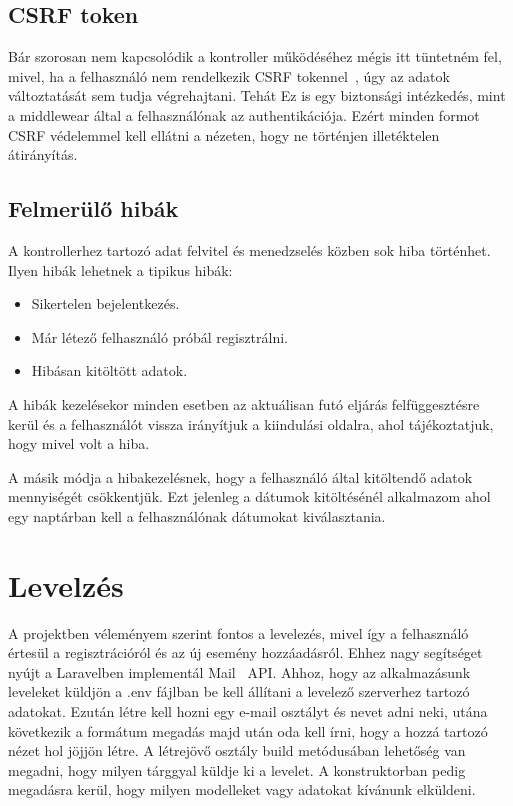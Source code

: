 \documentclass[
]{thesis-ekf}
\theoremstyle{definition}
\theoremstyle{remark}
\begin{document}
\subsection{CSRF token}

Bár szorosan nem kapcsolódik a kontroller működéséhez mégis itt tüntetném fel, mivel, ha a felhasználó nem rendelkezik CSRF tokennel~\cite{laravel_csrf}, úgy az adatok változtatását sem tudja végrehajtani. Tehát Ez is egy biztonsági intézkedés, mint a middlewear által a felhasználónak az authentikációja. Ezért minden formot CSRF védelemmel kell ellátni a nézeten, hogy ne történjen illetéktelen átirányítás.

\subsection{Felmerülő hibák}

A kontrollerhez tartozó adat felvitel és menedzselés közben sok hiba történhet. Ilyen hibák lehetnek a tipikus hibák:
\begin{itemize}
\item Sikertelen bejelentkezés. 
\item Már létező felhasználó próbál regisztrálni.
\item Hibásan kitöltött adatok.
\end{itemize}
A hibák kezelésekor minden esetben az aktuálisan futó eljárás felfüggesztésre kerül és a felhasználót vissza irányítjuk a kiindulási oldalra, ahol tájékoztatjuk, hogy mivel volt a hiba. 

A másik módja a hibakezelésnek, hogy a felhasználó által kitöltendő adatok mennyiségét csökkentjük. Ezt jelenleg a dátumok kitöltésénél alkalmazom ahol egy naptárban kell a felhasználónak dátumokat kiválasztania. 


\section{Levelzés}
A projektben véleményem szerint fontos a levelezés, mivel így a felhasználó értesül a regisztrációról és az új esemény hozzáadásról. Ehhez nagy segítséget nyújt a Laravelben implementál Mail~\cite{laravel_mail} API. Ahhoz, hogy az alkalmazásunk leveleket küldjön a .env fájlban be kell állítani a levelező szerverhez tartozó adatokat. Ezután létre kell hozni egy e-mail osztályt és nevet adni neki, utána következik a formátum megadás majd után oda kell írni, hogy a hozzá tartozó nézet hol jöjjön létre. A létrejövő osztály build metódusában lehetőség van megadni, hogy milyen tárggyal küldje ki a levelet. A konstruktorban pedig megadásra kerül, hogy milyen modelleket vagy adatokat kívánunk elküldeni.
\end{document}

